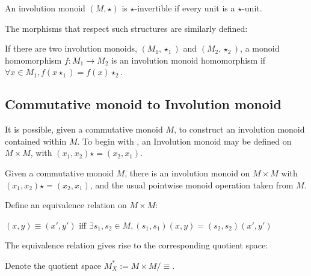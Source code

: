 \begin{definition}
  \label{def:star_invertibility}
  \leanok
  An involution monoid $(M,\star)$ is $\star$-invertible if every unit is a $\star$-unit.
\end{definition}
The morphisms that respect such structures are similarly defined:
\begin{definition}
  \label{def:involution_monoid_morphism}
  \leanok
  If there are two involution monoids, $(M_{1},\star_{1})$ and $(M_{2},\star_{2})$, a monoid homomorphism $f : M_{1} \rightarrow M_{2}$ 
  is an involution monoid homomorphism if $\forall x ∈ M_{1}, f (x\star_{1}) = f (x)\star_{2}$.
\end{definition}
\subsection{Commutative monoid to Involution monoid}
It is possible, given a commutative monoid $M$, to construct an involution monoid contained within $M$. To begin with , an Involution
monoid may be defined on $M \times M$, with $(x_{1},x_{2})\star = (x_{2},x_{1})$.
\begin{definition}
  \label{def:involution_monoid_prod_space}
  \leanok
  Given a commutative monoid $M$, there is an involution monoid on $M \times M$ with $(x_{1},x_{2})\star = (x_{2},x_{1})$, and 
  the usual pointwise monoid operation taken from $M$.
\end{definition}
Define an equivalence relation on $M \times M$:
\begin{definition}
  \label{def:involution_monoid_setoid}
  \leanok
  $(x,y) \equiv (x',y')$ iff $\exists s_{1}, s_{2} \in M,(s_{1},s_{1})(x,y) = (s_{2},s_{2})(x',y')$
\end{definition}
The equivalence relation gives rise to the corresponding quotient space:
\begin{definition}
  \label{def:MStar}
  \leanok
  Denote the quotient space $M^{*}_{X} := M \times M / \equiv$.
\end{definition}
